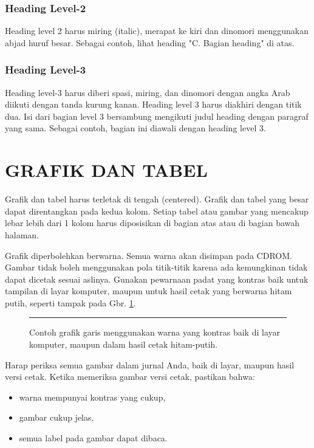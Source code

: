 \documentclass[10pt,twocolumn]{article}
\newcommand{\eightp}{\fontsize{8}{9.6}\selectfont}
\begin{document}
\subsubsection{Heading Level-2} Heading level 2 harus miring (italic), merapat ke kiri dan dinomori menggunakan abjad huruf besar. Sebagai contoh, lihat heading "C. Bagian heading" di atas.

\subsubsection{Heading Level-3} Heading level-3 harus diberi spasi, miring, dan dinomori dengan angka Arab diikuti dengan tanda kurung kanan. Heading level 3 harus diakhiri dengan titik dua. Isi dari bagian level 3 bersambung mengikuti judul heading dengan paragraf yang sama. Sebagai contoh, bagian ini diawali dengan heading level 3.

\section{\MakeUppercase{Grafik dan Tabel}}
Grafik dan tabel harus terletak di tengah (centered). Grafik dan tabel yang besar dapat direntangkan pada kedua kolom. Setiap tabel atau gambar yang mencakup lebar lebih dari 1 kolom harus diposisikan di bagian atas atau di bagian bawah halaman.

Grafik diperbolehkan berwarna. Semua warna akan disimpan pada CDROM. Gambar tidak boleh menggunakan pola titik-titik karena ada kemungkinan tidak dapat dicetak sesuai aslinya. Gunakan pewarnaan padat yang kontras baik untuk tampilan di layar komputer, maupun untuk hasil cetak yang berwarna hitam putih, seperti tampak pada Gbr. \ref{fig:contoh_grafik}.

\begin{figure}[h]
\centering
\rule{\columnwidth}{3cm} %
\caption{\eightp Contoh grafik garis menggunakan warna yang kontras baik di layar komputer, maupun dalam hasil cetak hitam-putih.}
\label{fig:contoh_grafik}
\end{figure}

Harap periksa semua gambar dalam jurnal Anda, baik di layar, maupun hasil versi cetak. Ketika memeriksa gambar versi cetak, pastikan bahwa:
\begin{itemize}
\item warna mempunyai kontras yang cukup,
\item gambar cukup jelas,
\item semua label pada gambar dapat dibaca.
\end{itemize}
\end{document}
